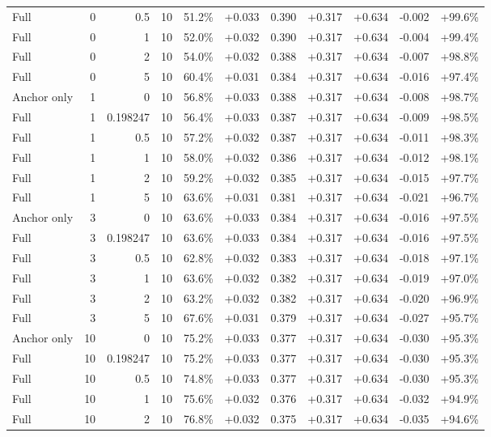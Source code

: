\begin{table}[htbp]
\begin{tabular}{lrrrccccccc}
Full & 0 & 0.5 & 10 & 51.2\% & +0.033 & 0.390 & +0.317 & +0.634 & -0.002 & +99.6\% \\
Full & 0 & 1 & 10 & 52.0\% & +0.032 & 0.390 & +0.317 & +0.634 & -0.004 & +99.4\% \\
Full & 0 & 2 & 10 & 54.0\% & +0.032 & 0.388 & +0.317 & +0.634 & -0.007 & +98.8\% \\
Full & 0 & 5 & 10 & 60.4\% & +0.031 & 0.384 & +0.317 & +0.634 & -0.016 & +97.4\% \\
Anchor only & 1 & 0 & 10 & 56.8\% & +0.033 & 0.388 & +0.317 & +0.634 & -0.008 & +98.7\% \\
Full & 1 & 0.198247 & 10 & 56.4\% & +0.033 & 0.387 & +0.317 & +0.634 & -0.009 & +98.5\% \\
Full & 1 & 0.5 & 10 & 57.2\% & +0.032 & 0.387 & +0.317 & +0.634 & -0.011 & +98.3\% \\
Full & 1 & 1 & 10 & 58.0\% & +0.032 & 0.386 & +0.317 & +0.634 & -0.012 & +98.1\% \\
Full & 1 & 2 & 10 & 59.2\% & +0.032 & 0.385 & +0.317 & +0.634 & -0.015 & +97.7\% \\
Full & 1 & 5 & 10 & 63.6\% & +0.031 & 0.381 & +0.317 & +0.634 & -0.021 & +96.7\% \\
Anchor only & 3 & 0 & 10 & 63.6\% & +0.033 & 0.384 & +0.317 & +0.634 & -0.016 & +97.5\% \\
Full & 3 & 0.198247 & 10 & 63.6\% & +0.033 & 0.384 & +0.317 & +0.634 & -0.016 & +97.5\% \\
Full & 3 & 0.5 & 10 & 62.8\% & +0.032 & 0.383 & +0.317 & +0.634 & -0.018 & +97.1\% \\
Full & 3 & 1 & 10 & 63.6\% & +0.032 & 0.382 & +0.317 & +0.634 & -0.019 & +97.0\% \\
Full & 3 & 2 & 10 & 63.2\% & +0.032 & 0.382 & +0.317 & +0.634 & -0.020 & +96.9\% \\
Full & 3 & 5 & 10 & 67.6\% & +0.031 & 0.379 & +0.317 & +0.634 & -0.027 & +95.7\% \\
Anchor only & 10 & 0 & 10 & 75.2\% & +0.033 & 0.377 & +0.317 & +0.634 & -0.030 & +95.3\% \\
Full & 10 & 0.198247 & 10 & 75.2\% & +0.033 & 0.377 & +0.317 & +0.634 & -0.030 & +95.3\% \\
Full & 10 & 0.5 & 10 & 74.8\% & +0.033 & 0.377 & +0.317 & +0.634 & -0.030 & +95.3\% \\
Full & 10 & 1 & 10 & 75.6\% & +0.032 & 0.376 & +0.317 & +0.634 & -0.032 & +94.9\% \\
Full & 10 & 2 & 10 & 76.8\% & +0.032 & 0.375 & +0.317 & +0.634 & -0.035 & +94.6\% \\

\end{tabular}
\end{table}
